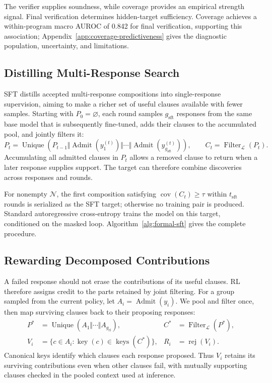 The verifier supplies soundness, while coverage provides an empirical strength
signal. Final verification determines hidden-target sufficiency. Coverage
achieves a within-program macro
AUROC of 0.842 for final verification, supporting this association;
Appendix~\ref{app:coverage-predictiveness} gives the diagnostic population,
uncertainty, and limitations.

\subsection{Distilling Multi-Response Search}
\label{sec:method:sft}

SFT distills accepted multi-response compositions into single-response
supervision, aiming to make a richer set of useful clauses available with
fewer samples.  Starting with \(P_0=\varnothing\), each round samples \(g_{\mathrm{sft}}\) responses
from the same base model that is subsequently fine-tuned, adds their clauses
to the accumulated pool, and jointly filters it:
\begin{equation}
  P_t=\operatorname{Unique}\!\left(P_{t-1}\Vert
    \operatorname{Admit}(y_1^{(t)})\Vert\cdots\Vert
    \operatorname{Admit}(y_{g_{\mathrm{sft}}}^{(t)})\right),
  \qquad
  C_t=\operatorname{Filter}_{\mathcal L}(P_t).
  \label{eq:method-sft}
\end{equation}
Accumulating all admitted clauses in \(P_t\) allows a removed clause to return
when a later response supplies support.
The target can therefore combine discoveries across responses and rounds.

For nonempty \(\mathcal N\), the first composition satisfying
\(\operatorname{cov}(C_t)\ge\tau\) within \(t_{\mathrm{sft}}\) rounds is
serialized as the SFT target; otherwise no training pair is produced.
Standard autoregressive cross-entropy trains the model on this target,
conditioned on the masked loop.  Algorithm~\ref{alg:formal-sft} gives the
complete procedure.

\subsection{Rewarding Decomposed Contributions}
\label{sec:method:reward}

A failed response should not erase the contributions of its useful clauses.
RL therefore assigns credit to the parts retained by joint filtering.
For a group sampled from the current policy, let
\(A_i=\operatorname{Admit}(y_i)\).  We pool and filter once, then map
surviving clauses back to their proposing responses:
\begin{align}
  P^*&=\operatorname{Unique}\!\left(A_1\Vert\cdots\Vert A_{g_{\mathrm{rl}}}\right),
  &C^*&=\operatorname{Filter}_{\mathcal L}(P^*),\\
  V_i&=\{c\in A_i:\operatorname{key}(c)\in\operatorname{keys}(C^*)\},
  &R_i&=\operatorname{rej}(V_i).
  \label{eq:method-credit-pool}
\end{align}
Canonical keys identify which clauses each response proposed.  Thus \(V_i\)
retains its surviving contributions even when other clauses fail, with
mutually supporting clauses checked in the pooled context used at inference.

